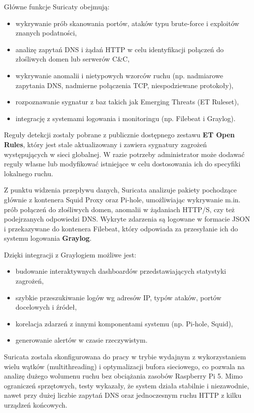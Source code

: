 \documentclass[
    left=2.5cm,         %
    right=2.5cm,        %
    top=2.5cm,          %
    bottom=3cm,         %
    bindingoffset=6mm,  %
    nohyphenation=true %
]{eiti/eiti-thesis} %
\begin{document}
Główne funkcje Suricaty obejmują:
\begin{itemize}
    \item wykrywanie prób skanowania portów, ataków typu brute-force i exploitów znanych podatności,
    \item analizę zapytań DNS i żądań HTTP w celu identyfikacji połączeń do złośliwych domen lub serwerów C\&C,
    \item wykrywanie anomalii i nietypowych wzorców ruchu (np. nadmiarowe zapytania DNS, nadmierne połączenia TCP, niespodziewane protokoły),
    \item rozpoznawanie sygnatur z baz takich jak Emerging Threats (ET Ruleset),
    \item integrację z systemami logowania i monitoringu (np. Filebeat i Graylog).
\end{itemize}

Reguły detekcji zostały pobrane z publicznie dostępnego zestawu \textbf{ET Open Rules}, który jest stale aktualizowany i zawiera sygnatury zagrożeń występujących w sieci globalnej. W razie potrzeby administrator może dodawać reguły własne lub modyfikować istniejące w celu dostosowania ich do specyfiki lokalnego ruchu.

Z punktu widzenia przepływu danych, Suricata analizuje pakiety pochodzące głównie z kontenera Squid Proxy oraz Pi-hole, umożliwiając wykrywanie m.in. prób połączeń do złośliwych domen, anomalii w żądaniach HTTP/S, czy też podejrzanych odpowiedzi DNS. Wykryte zdarzenia są logowane w formacie JSON i przekazywane do kontenera Filebeat, który odpowiada za przesyłanie ich do systemu logowania \textbf{Graylog}.

Dzięki integracji z Graylogiem możliwe jest:
\begin{itemize}
    \item budowanie interaktywnych dashboardów przedstawiających statystyki zagrożeń,
    \item szybkie przeszukiwanie logów wg adresów IP, typów ataków, portów docelowych i źródeł,
    \item korelacja zdarzeń z innymi komponentami systemu (np. Pi-hole, Squid),
    \item generowanie alertów w czasie rzeczywistym.
\end{itemize}

Suricata została skonfigurowana do pracy w trybie wydajnym z wykorzystaniem wielu wątków (multithreading) i optymalizacji bufora sieciowego, co pozwala na analizę dużego wolumenu ruchu bez obciążania zasobów Raspberry Pi 5. Mimo ograniczeń sprzętowych, testy wykazały, że system działa stabilnie i niezawodnie, nawet przy dużej liczbie zapytań DNS oraz jednoczesnym ruchu HTTP z kilku urządzeń końcowych.
\end{document}
